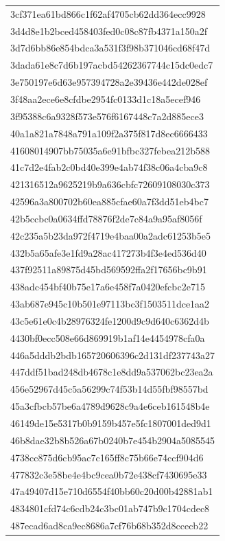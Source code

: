 \begin{tabular}{l}
3cf371ea61bd866c1f62af4705cb62dd364ecc9928 \\
3d4d8e1b2bced458403fed0c08c87fb4371a150a2f \\
3d7d6bb86e854bdca3a531f3f98b371046cd68f47d \\
3dada61e8c7d6b197acbd54262367744c15dc0edc7 \\
3e750197e6d63e957394728a2e39436e442de028ef \\
3f48aa2ece6e8cfdbe2954fc0133d1c18a5ecef946 \\
3f95388c6a9328f573e576f6167448c7a2d885ece3 \\
40a1a821a7848a791a109f2a375f817d8ec6666433 \\
41608014907bb75035a6e91bfbc327febea212b588 \\
41c7d2e4fab2c0bd40e399e4ab74f38c06a4cba9c8 \\
421316512a9625219b9a636cbfc72609108030c373 \\
42596a3a800702b60ea885cfae60a7f3dd51eb4bc7 \\
42b5ccbc0a0634ffd78876f2de7c84a9a95af8056f \\
42c235a5b23da972f4719e4baa00a2adc61253b5e5 \\
432b5a65afe3e1fd9a28ac417273b4f3e4ed536d40 \\
437f92511a89875d45bd569592ffa2f17656bc9b91 \\
438adc454bf40b75e17a6e458f7a0420efcbc2e715 \\
43ab687e945c10b501e97113bc3f1503511dce1aa2 \\
43c5e61e0c4b28976324fe1200d9c9d640c6362d4b \\
4430bf0ecc508e66d869919b1af14e4454978cfa0a \\
446a5dddb2bdb165720606396c2d131df237743a27 \\
447ddf51bad248db4678c1e8dd9a537062bc23ea2a \\
456e52967d45c5a56299c74f53b14d55fbf98557bd \\
45a3cfbcb57be6a4789d9628c9a4e6ceb161548b4e \\
46149de15e5317b0b9159b457e5fc1807001ded9d1 \\
46b8dae32b8b526a67b0240b7e454b2904a5085545 \\
4738cc875d6cb95ac7c165ff8c75b66e74ccf904d6 \\
477832c3e58be4e4bc9cea0b72e438cf7430695e33 \\
47a49407d15e710d6554f40bb60c20d00b42881ab1 \\
4834801cfd74c6cdb24c3bc01ab747b9c1704cdec8 \\
487ecad6ad8ca9ec8686a7cf76b68b352d8ccecb22 \\

\end{tabular}
